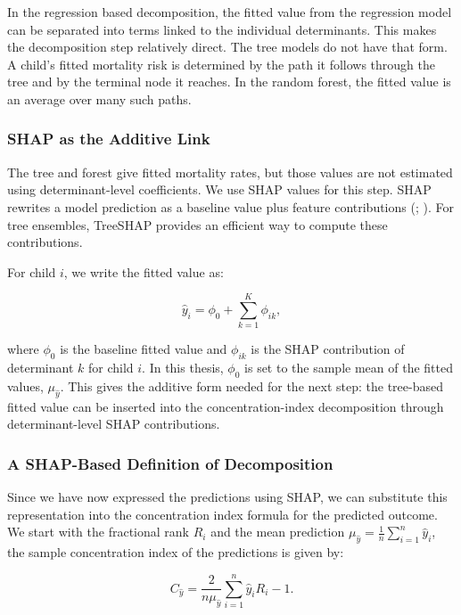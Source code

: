 \documentclass[
  11pt,
  a4paper,
]{article}
\begin{document}
In the regression based decomposition, the fitted value from the
regression model can be separated into terms linked to the individual
determinants. This makes the decomposition step relatively direct. The
tree models do not have that form. A child's fitted mortality risk is
determined by the path it follows through the tree and by the terminal
node it reaches. In the random forest, the fitted value is an average
over many such paths.

\subsubsection{SHAP as the Additive Link}\label{sec-shap-additive-link}

The tree and forest give fitted mortality rates, but those values are
not estimated using determinant-level coefficients. We use SHAP values
for this step. SHAP rewrites a model prediction as a baseline value plus
feature contributions (; ). For tree ensembles, TreeSHAP provides an efficient way to
compute these contributions.

For child \(i\), we write the fitted value as:

\[
\hat{y}_i = \phi_0 + \sum_{k=1}^{K} \phi_{ik},
\]

where \(\phi_0\) is the baseline fitted value and \(\phi_{ik}\) is the
SHAP contribution of determinant \(k\) for child \(i\). In this thesis,
\(\phi_0\) is set to the sample mean of the fitted values,
\(\mu_{\hat{y}}\). This gives the additive form needed for the next
step: the tree-based fitted value can be inserted into the
concentration-index decomposition through determinant-level SHAP
contributions.

\subsubsection{A SHAP-Based Definition of
Decomposition}\label{sec-shap-decomposition-definition}

Since we have now expressed the predictions using SHAP, we can
substitute this representation into the concentration index formula for
the predicted outcome. We start with the fractional rank \(R_i\) and the
mean prediction \(\mu_{\hat{y}} = \frac{1}{n}\sum_{i=1}^n \hat{y}_i\),
the sample concentration index of the predictions is given by:

\[
C_{\hat{y}} = \frac{2}{n\mu_{\hat{y}}}\sum_{i=1}^n \hat{y}_i R_i - 1.
\]
\end{document}

